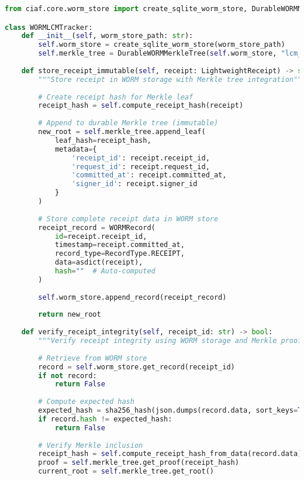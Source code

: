 \documentclass[12pt,a4paper]{article}
\begin{document}
\begin{lstlisting}[language=Python, caption=WORM-Enabled LCM Implementation]
from ciaf.core.worm_store import create_sqlite_worm_store, DurableWORMMerkleTree

class WORMLCMTracker:
    def __init__(self, worm_store_path: str):
        self.worm_store = create_sqlite_worm_store(worm_store_path)
        self.merkle_tree = DurableWORMMerkleTree(self.worm_store, "lcm_tree")
    
    def store_receipt_immutable(self, receipt: LightweightReceipt) -> str:
        """Store receipt in WORM storage with Merkle tree integration"""
        
        # Create receipt hash for Merkle leaf
        receipt_hash = self.compute_receipt_hash(receipt)
        
        # Append to durable Merkle tree (immutable)
        new_root = self.merkle_tree.append_leaf(
            leaf_hash=receipt_hash,
            metadata={
                'receipt_id': receipt.receipt_id,
                'request_id': receipt.request_id,
                'committed_at': receipt.committed_at,
                'signer_id': receipt.signer_id
            }
        )
        
        # Store complete receipt data in WORM store
        receipt_record = WORMRecord(
            id=receipt.receipt_id,
            timestamp=receipt.committed_at,
            record_type=RecordType.RECEIPT,
            data=asdict(receipt),
            hash=""  # Auto-computed
        )
        
        self.worm_store.append_record(receipt_record)
        
        return new_root
    
    def verify_receipt_integrity(self, receipt_id: str) -> bool:
        """Verify receipt integrity using WORM storage and Merkle proofs"""
        
        # Retrieve from WORM store
        record = self.worm_store.get_record(receipt_id)
        if not record:
            return False
        
        # Compute expected hash
        expected_hash = sha256_hash(json.dumps(record.data, sort_keys=True, separators=(",", ":"), ensure_ascii=True))
        if record.hash != expected_hash:
            return False
        
        # Verify Merkle inclusion
        receipt_hash = self.compute_receipt_hash_from_data(record.data)
        proof = self.merkle_tree.get_proof(receipt_hash)
        current_root = self.merkle_tree.get_root()
        

\end{lstlisting}
\end{document}
